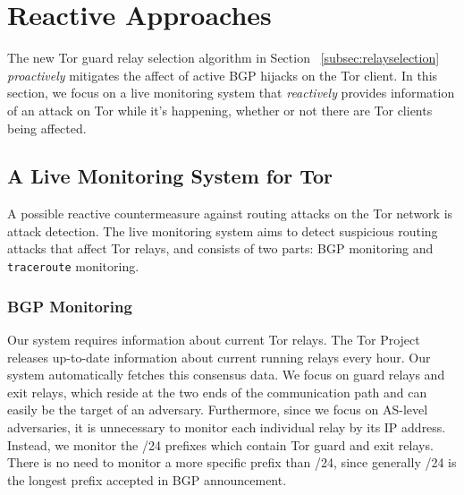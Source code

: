 \section{Reactive Approaches}
The new Tor guard relay selection algorithm in Section ~\ref{subsec:relayselection} \emph{proactively} mitigates the affect of active BGP hijacks on the Tor client. In this section, we focus on a live monitoring system that \emph{reactively} provides information of an attack on Tor while it's happening, whether or not there are Tor clients being affected. 

\subsection{A Live Monitoring System for Tor}
A possible reactive countermeasure against routing attacks on the Tor network is attack 
detection.  The live monitoring system aims to detect suspicious routing attacks that affect Tor relays, and consists of two parts: BGP monitoring and {\tt traceroute} monitoring.\\


\subsubsection{BGP Monitoring} 
\label{sec:bgp}

Our system requires information about current Tor relays.  The Tor Project releases up-to-date information about current running relays every hour. Our system automatically fetches this consensus data. We focus on guard relays and exit relays, which reside at the two ends of the communication path and can easily be the target of an adversary. Furthermore, since we focus on AS-level adversaries, it is unnecessary to monitor each individual relay by its IP address. Instead, we monitor the /24 prefixes which contain Tor guard and exit relays. There is no need to monitor a more specific prefix than /24, since generally /24 is the longest prefix accepted in BGP announcement.

